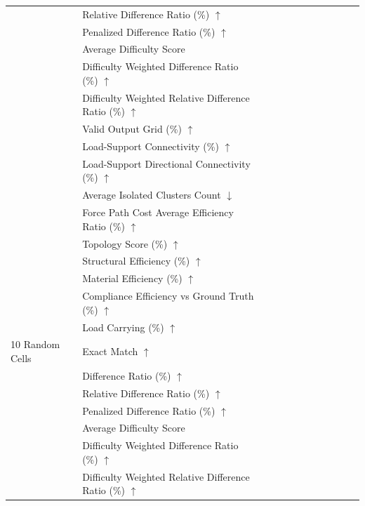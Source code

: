 \begin{table}[!h]
{\begin{tabular}{llllllllllll}
 & Relative Difference Ratio (\%) $\uparrow$ &  &  &  &  &  &  &  &  &  &  \\
 & Penalized Difference Ratio (\%) $\uparrow$ &  &  &  &  &  &  &  &  &  &  \\
 & Average Difficulty Score &  &  &  &  &  &  &  &  &  &  \\
 & Difficulty Weighted Difference Ratio (\%) $\uparrow$ &  &  &  &  &  &  &  &  &  &  \\
 & Difficulty Weighted Relative Difference Ratio (\%) $\uparrow$ &  &  &  &  &  &  &  &  &  &  \\
 & Valid Output Grid (\%) $\uparrow$ &  &  &  &  &  &  &  &  &  &  \\
 & Load-Support Connectivity (\%) $\uparrow$ &  &  &  &  &  &  &  &  &  &  \\
 & Load-Support Directional Connectivity (\%) $\uparrow$ &  &  &  &  &  &  &  &  &  &  \\
 & Average Isolated Clusters Count $\downarrow$ &  &  &  &  &  &  &  &  &  &  \\
 & Force Path Cost Average Efficiency Ratio (\%) $\uparrow$ &  &  &  &  &  &  &  &  &  &  \\
 & Topology Score (\%) $\uparrow$ &  &  &  &  &  &  &  &  &  &  \\
 & Structural Efficiency (\%) $\uparrow$ &  &  &  &  &  &  &  &  &  &  \\
 & Material Efficiency (\%) $\uparrow$ &  &  &  &  &  &  &  &  &  &  \\
 & Compliance Efficiency vs Ground Truth (\%) $\uparrow$ &  &  &  &  &  &  &  &  &  &  \\
 & Load Carrying (\%) $\uparrow$ &  &  &  &  &  &  &  &  &  &  \\
10 Random Cells & Exact Match $\uparrow$ &  &  &  &  &  &  &  &  &  &  \\
 & Difference Ratio (\%) $\uparrow$ &  &  &  &  &  &  &  &  &  &  \\
 & Relative Difference Ratio (\%) $\uparrow$ &  &  &  &  &  &  &  &  &  &  \\
 & Penalized Difference Ratio (\%) $\uparrow$ &  &  &  &  &  &  &  &  &  &  \\
 & Average Difficulty Score &  &  &  &  &  &  &  &  &  &  \\
 & Difficulty Weighted Difference Ratio (\%) $\uparrow$ &  &  &  &  &  &  &  &  &  &  \\
 & Difficulty Weighted Relative Difference Ratio (\%) $\uparrow$ &  &  &  &  &  &  &  &  &  &  \\

\end{tabular}}
\end{table}
